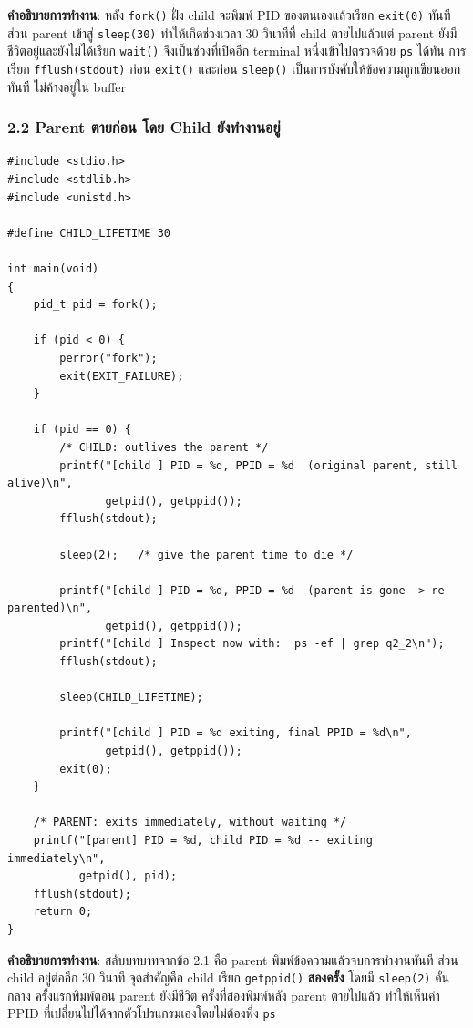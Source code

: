 \documentclass[a4paper,12pt]{article}
\newcommand{\code}[1]{\texttt{#1}}
\begin{document}
\textbf{คำอธิบายการทำงาน}: หลัง \code{fork()} ฝั่ง child จะพิมพ์ PID ของตนเองแล้วเรียก \code{exit(0)} ทันที ส่วน parent เข้าสู่ \code{sleep(30)} ทำให้เกิดช่วงเวลา 30 วินาทีที่ child ตายไปแล้วแต่ parent ยังมีชีวิตอยู่และยังไม่ได้เรียก \code{wait()} จึงเป็นช่วงที่เปิดอีก terminal หนึ่งเข้าไปตรวจด้วย \code{ps} ได้ทัน การเรียก \code{fflush(stdout)} ก่อน \code{exit()} และก่อน \code{sleep()} เป็นการบังคับให้ข้อความถูกเขียนออกทันที ไม่ค้างอยู่ใน buffer

\newpage

\subsubsection{2.2 Parent ตายก่อน โดย Child ยังทำงานอยู่}

\begin{lstlisting}[caption={q2\_2\_parent\_first.c -- parent dies first, child becomes an orphan},label={lst:q2_2}]
#include <stdio.h>
#include <stdlib.h>
#include <unistd.h>

#define CHILD_LIFETIME 30

int main(void)
{
    pid_t pid = fork();

    if (pid < 0) {
        perror("fork");
        exit(EXIT_FAILURE);
    }

    if (pid == 0) {
        /* CHILD: outlives the parent */
        printf("[child ] PID = %d, PPID = %d  (original parent, still alive)\n",
               getpid(), getppid());
        fflush(stdout);

        sleep(2);   /* give the parent time to die */

        printf("[child ] PID = %d, PPID = %d  (parent is gone -> re-parented)\n",
               getpid(), getppid());
        printf("[child ] Inspect now with:  ps -ef | grep q2_2\n");
        fflush(stdout);

        sleep(CHILD_LIFETIME);

        printf("[child ] PID = %d exiting, final PPID = %d\n",
               getpid(), getppid());
        exit(0);
    }

    /* PARENT: exits immediately, without waiting */
    printf("[parent] PID = %d, child PID = %d -- exiting immediately\n",
           getpid(), pid);
    fflush(stdout);
    return 0;
}
\end{lstlisting}

\textbf{คำอธิบายการทำงาน}: สลับบทบาทจากข้อ 2.1 คือ parent พิมพ์ข้อความแล้วจบการทำงานทันที ส่วน child อยู่ต่ออีก 30 วินาที จุดสำคัญคือ child เรียก \code{getppid()} \textbf{สองครั้ง} โดยมี \code{sleep(2)} คั่นกลาง ครั้งแรกพิมพ์ตอน parent ยังมีชีวิต ครั้งที่สองพิมพ์หลัง parent ตายไปแล้ว ทำให้เห็นค่า PPID ที่เปลี่ยนไปได้จากตัวโปรแกรมเองโดยไม่ต้องพึ่ง \code{ps}
\end{document}
